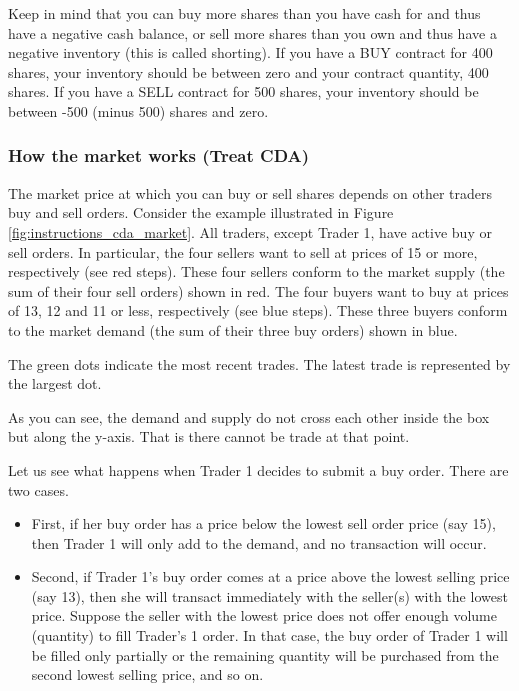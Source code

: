 Keep in mind that you can buy more shares than you have cash for and
thus have a negative cash balance, or sell more shares than you own and
thus have a negative inventory (this is called shorting). If you have a
BUY contract for 400 shares, your inventory should be between zero and
your contract quantity, 400 shares. If you have a SELL contract for 500
shares, your inventory should be between -500 (minus 500) shares and
zero.

\subsubsection*{How the market works (Treat
CDA)}\label{how-the-market-works-treat-cda}

The market price at which you can buy or sell shares depends on other
traders\textquotesingle{} buy and sell orders. Consider the example
illustrated in Figure \ref{fig:instructions_cda_market}. All traders, except Trader 1, have active buy or sell orders. In particular, the four sellers want to sell at prices of 15 or more, respectively (see red steps). These four sellers conform to the market supply (the sum of their four sell orders) shown in red. The four buyers want to buy at prices of 13, 12 and 11 or less,
respectively (see blue steps). These three buyers conform to the market
demand (the sum of their three buy orders) shown in blue.

The green dots indicate the most recent trades. The latest trade is
represented by the largest dot.

As you can see, the demand and supply do not cross each other inside the
box but along the y-axis. That is there cannot be trade at that point.

Let us see what happens when Trader 1 decides to submit a buy order.
There are two cases.

\begin{itemize}
\item
  First, if her buy order has a price below the lowest sell order price
  (say 15), then Trader 1 will only add to the demand, and no
  transaction will occur.
\item
  Second, if Trader 1's buy order comes at a price above the lowest
  selling price (say 13), then she will transact immediately with the
  seller(s) with the lowest price. Suppose the seller with the lowest
  price does not offer enough volume (quantity) to fill Trader's 1
  order. In that case, the buy order of Trader 1 will be filled only
  partially or the remaining quantity will be purchased from the second
  lowest selling price, and so on.
\end{itemize}

